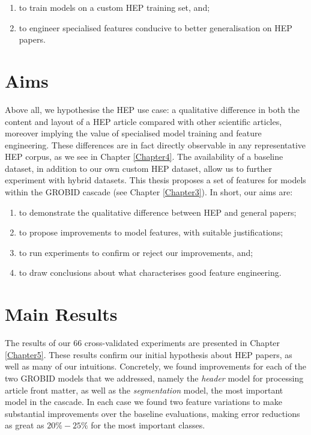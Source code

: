\begin{enumerate}
\item to train models on a custom HEP training set, and;
\item to engineer specialised features conducive to better generalisation on HEP papers.
\end{enumerate}

\section{Aims}

Above all, we hypothesise the HEP use case: a qualitative difference in both the content and layout of a HEP article compared with other scientific articles, moreover implying the value of specialised model training and feature engineering. These differences are in fact directly observable in any representative HEP corpus, as we see in Chapter \ref{Chapter4}. The availability of a baseline dataset, in addition to our own custom HEP dataset, allow us to further experiment with hybrid datasets. This thesis proposes a set of features for models within the GROBID cascade (see Chapter \ref{Chapter3}). In short, our aims are:

\begin{enumerate}
\item to demonstrate the qualitative difference between HEP and general papers;
\item to propose improvements to model features, with suitable justifications;
\item to run experiments to confirm or reject our improvements, and;
\item to draw conclusions about what characterises good feature engineering.
\end{enumerate}

\section{Main Results}

The results of our 66 cross-validated experiments are presented in Chapter \ref{Chapter5}. These results confirm our initial hypothesis about HEP papers, as well as many of our intuitions. Concretely, we found improvements for each of the two GROBID models that we addressed, namely the \emph{header} model for processing article front matter, as well as the \emph{segmentation} model, the most important model in the cascade. In each case we found two feature variations to make substantial improvements over the baseline evaluations, making error reductions as great as $20\%-25\%$ for the most important classes.

